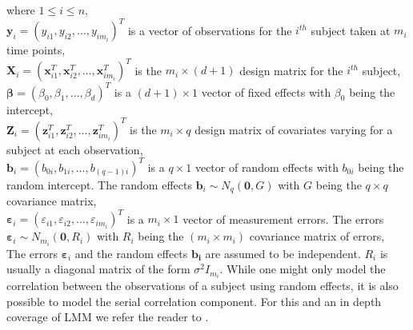 where $1 \le i \le n$,\\
$\boldsymbol{y}_i = {(y_{i1}, y_{i2}, \ldots, y_{im_i})}^T$ is a vector of observations for the $i^{th}$ subject taken at $m_i$ time points,\\
$\boldsymbol{X}_i = {(\boldsymbol{x}_{i1}^T, \boldsymbol{x}_{i2}^T, \ldots, \boldsymbol{x}_{im_i}^T)}^T$ is the $m_i \times (d+1)$ design matrix for the $i^{th}$ subject,\\
$\boldsymbol{\beta} = {(\beta_0, \beta_1, \ldots, \beta_d)}^T$ is a $(d+1) \times 1$ vector of fixed effects with $\beta_0$ being the intercept,\\
$\boldsymbol{Z}_i = {(\boldsymbol{z}_{i1}^T, \boldsymbol{z}_{i2}^T, \ldots, \boldsymbol{z}_{im_i}^T)}^T$ is the $m_i \times q$ design matrix of covariates varying for a subject at each observation,\\
$\boldsymbol{b}_i = {(b_{0i}, b_{1i}, \ldots, b_{(q-1)i})}^T$ is a $q \times 1$ vector of random effects with $b_{0i}$ being the random intercept. The random effects $\boldsymbol{b}_i \sim N_q(\boldsymbol{0}, G)$ with $G$ being the $q \times q$ covariance matrix,\\ 
$\boldsymbol{\varepsilon}_{i} = {(\varepsilon_{i1}, \varepsilon_{i2}, \ldots, \varepsilon_{im_i})}^T$ is a $m_i \times 1$ vector of measurement errors. The errors $\boldsymbol{\varepsilon}_{i} \sim N_{m_i}(\boldsymbol{0}, R_i)$ with $R_i$ being the $(m_i \times m_i)$ covariance matrix of errors,\\

The errors $\boldsymbol{\varepsilon}_{i}$ and the random effects $\boldsymbol{b_i}$ are assumed to be independent. $R_i$ is usually a diagonal matrix of the form $\sigma^2I_{m_i}$. While one might only model the correlation between the observations of a subject using random effects, it is also possible to model the serial correlation component. For this and an in depth coverage of LMM we refer the reader to \citet{verbeke_linear_2009}.\\

